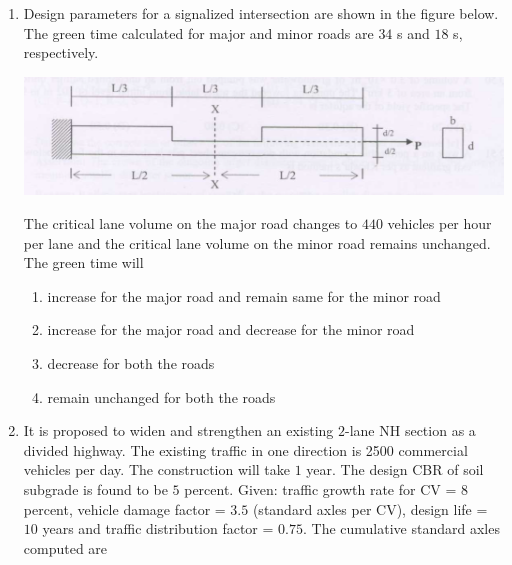\documentclass[journal]{IEEEtran}
\begin{document}
\begin{enumerate}
\item Design parameters for a signalized intersection are shown in the figure below. The green time calculated for major and minor roads are $34$ s and $18$ s, respectively. \hfill {}

\includegraphics[width=\columnwidth]{figs/fig2.png} 

The critical lane volume on the major road changes to $440$ vehicles per hour per lane and the critical lane volume on the minor road remains unchanged. The green time will


\begin{enumerate}
\item increase for the major road and remain same for the minor road
\item increase for the major road and decrease for the minor road
\item decrease for both the roads
\item remain unchanged for both the roads
\end{enumerate}  


\item It is proposed to widen and strengthen an existing $2$-lane NH section as a divided highway. The existing traffic in one direction is 2500 commercial vehicles  per day. The construction will take $1$ year. The design CBR of soil subgrade is found to be $5$ percent. Given: traffic growth rate for CV = $8$ percent, vehicle damage factor = $3.5$ (standard axles per CV), design life = $10$ years and traffic distribution factor = $0.75$. The cumulative standard axles  computed are \hfill {}
\begin{enumerate}
\end{enumerate}


\end{enumerate}
\end{document}
